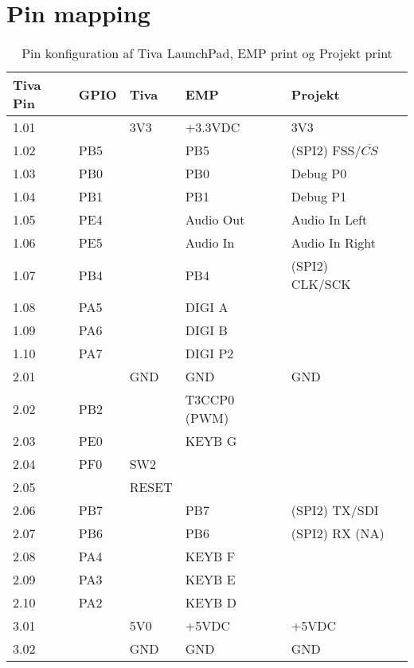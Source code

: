 \chapter{Pin mapping} \label{bilag:pinmap}
\begin{table}[h!]
	\centering
	\caption{Pin konfiguration af Tiva LaunchPad, EMP print og Projekt print}
	\label{tab:pin_mapping}
	\begin{threeparttable}
		\begin{tabular}{l l l l l l}
			\toprule
			\textbf{Tiva Pin\tnote{a}} 	& 
			\textbf{GPIO\tnote{b}}  	&
			\textbf{Tiva\tnote{c}} 		& 
			\textbf{EMP\tnote{d}}  		&
			\textbf{Projekt\tnote{e}} 	\\ 
			\midrule
			1.01 &      & 3V3  	& +3.3VDC		& 3V3		\\
			1.02 &  PB5 &      	& PB5			& (SPI2) FSS/$\overline{CS}$		\\
			1.03 &	PB0 &	   	& PB0			& Debug P0	\\
			1.04 &	PB1 &      	& PB1			& Debug	P1	\\
			1.05 &	PE4 &	   	& Audio Out     & Audio In Left	\\
			1.06 &	PE5 &	   	& Audio In		& Audio In Right \\
			1.07 &	PB4 &	   	& PB4			& (SPI2) CLK/SCK		\\
			1.08 &	PA5 &	   	& DIGI A		& 					\\
			1.09 &	PA6 &	   	& DIGI B    	& 								\\
			1.10 &	PA7 &	   	& DIGI P2		& 								\\
			\midrule
			2.01 &     	& GND  	& GND  			& GND 						\\
			2.02 & PB2 	&      	& T3CCP0 (PWM)	& 							\\
			2.03 & PE0 	&	  	& KEYB G 		&								\\
			2.04 & PF0 	& SW2	& 				&								\\
			2.05 &     	& RESET	& 				&								\\
			2.06 & PB7	&		& PB7			& (SPI2) TX/SDI					\\
			2.07 & PB6	&		& PB6			& (SPI2) RX (NA)				\\
			2.08 & PA4 	&      	& KEYB F 		&						\\
			2.09 & PA3 	&		& KEYB E    	& 						\\
			2.10 & PA2  &		& KEYB D		& 						\\
			\midrule
			3.01 &		& 5V0	& +5VDC			&	+5VDC							\\
			3.02 &		& GND	& GND			&	GND							\\

\end{tabular}
\end{threeparttable}
\end{table}
